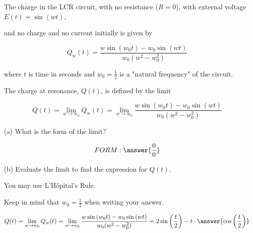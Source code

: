 \documentclass{ximera}
\author{Nela Lakos}
\begin{document}
\begin{exercise}
The charge in the LCR circuit, with no resistance ($R=0$), with external voltage $E(t)=\sin{(w t)}$, 

and no charge and no current initially is given by

\[
Q_{w}(t)=\frac{w\sin{(w_{0} t)-w_{0}\sin{(w t)}}}{w_{0}(w^2-w_{0}^2)}
\]

where $t$ is time in seconds and $w_{0}=\frac{1}{2}$ is a "natural frequency" of the circuit.

The charge at resonance, $Q(t)$, is defined by the limit

\[
Q(t)=\lim_{w\to w_{0}} Q_{w}(t)=\lim_{w\to w_{0}} \frac{w\sin{(w_{0} t)-w_{0}\sin{(w t)}}}{w_{0}(w^2-w_{0}^2)}
\]

(a) What is the form of the limit?

\[
FORM:\answer{\frac{0}{0}}
\]

(b)  Evaluate the limit to find the expression for $Q(t)$. 

You may use L’Hôpital’s Rule.


Keep in mind that $w_{0}=\frac{1}{2}$ when writing your answer. 

\[
Q(t)=\lim_{w\to w_{0}} Q_{w}(t)=\lim_{w\to w_{0}} \frac{w\sin{(w_{0} t)-w_{0}\sin{(w t)}}}{w_{0}(w^2-w_{0}^2)}=2\sin{\left(\frac{ t}{2}\right)-t\cdot\answer{\cos{\left(\frac{t}{2}\right)}}}
\]



\end{exercise}
\end{document}
